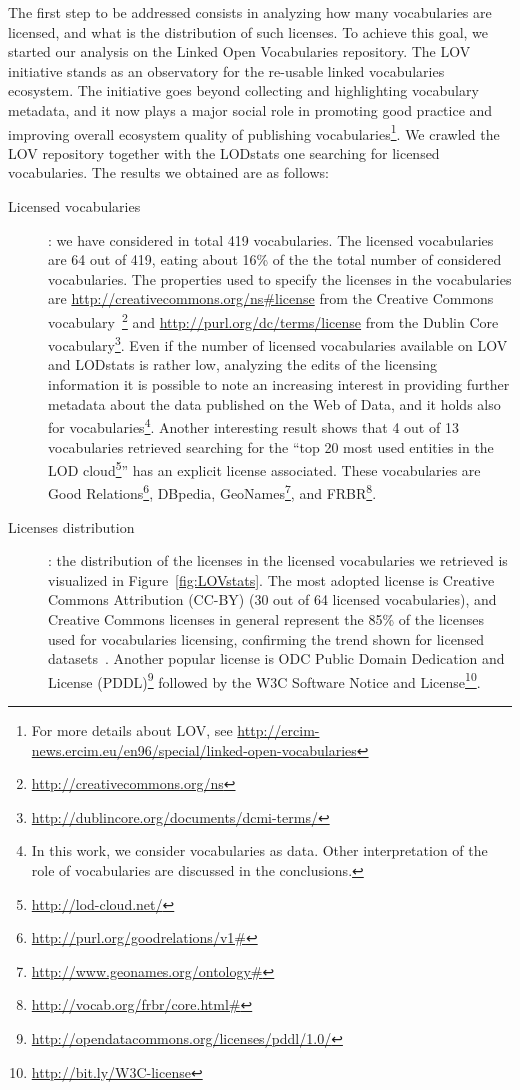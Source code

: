 The first step to be addressed consists in analyzing how many vocabularies are licensed, and what is the distribution of such licenses. To achieve this goal, we started our analysis on the Linked Open Vocabularies repository. The LOV initiative stands as an observatory for the re-usable linked vocabularies ecosystem. The initiative goes beyond collecting and highlighting vocabulary metadata, and it now plays a major social role in promoting good practice and improving overall ecosystem quality of publishing vocabularies\footnote{For more details about LOV, see \url{http://ercim-news.ercim.eu/en96/special/linked-open-vocabularies}}. We crawled the LOV repository together with the LODstats one searching for licensed vocabularies. The results we obtained are as follows:
\begin{description}
\item[Licensed vocabularies]: we have considered in total 419 vocabularies. The licensed vocabularies are 64 out of 419, eating about 16\% of the the total number of considered vocabularies. The properties used to specify the licenses in the vocabularies are \url{http://creativecommons.org/ns\#license} from the Creative Commons vocabulary~\footnote{\url{http://creativecommons.org/ns}} and \url{http://purl.org/dc/terms/license} from the Dublin Core vocabulary\footnote{\url{http://dublincore.org/documents/dcmi-terms/}}. Even if the number of licensed vocabularies available on LOV and LODstats is rather low, analyzing the edits of the licensing information it is possible to note an increasing interest in providing further metadata about the data published on the Web of Data, and it holds also for vocabularies\footnote{In this work, we consider vocabularies as data. Other interpretation of the role of vocabularies are discussed in the conclusions.}. Another interesting result shows that 4 out of 13 vocabularies retrieved searching for the ``top 20 most used entities in the LOD cloud\footnote{\url{http://lod-cloud.net/}}'' has an explicit license associated. These vocabularies are Good Relations\footnote{\url{http://purl.org/goodrelations/v1\#}}, DBpedia, GeoNames\footnote{\url{http://www.geonames.org/ontology\#}}, and FRBR\footnote{\url{http://vocab.org/frbr/core.html\#}}.   
\item[Licenses distribution]: the distribution of the licenses in the licensed vocabularies we retrieved is visualized in Figure~\ref{fig:LOVstats}. The most adopted license is Creative Commons Attribution (CC-BY) (30 out of 64 licensed vocabularies), and Creative Commons licenses in general represent the 85\% of the licenses used for vocabularies licensing, confirming the trend shown for licensed datasets~\cite{DBLP:conf/semweb/Rodriguez-DoncelGM13,DBLP:conf/semweb/GovernatoriRVG13}. Another popular license is ODC Public Domain Dedication and License (PDDL)\footnote{\url{http://opendatacommons.org/licenses/pddl/1.0/}} followed by the W3C Software Notice and License\footnote{\url{http://bit.ly/W3C-license}}.  
\end{description}

